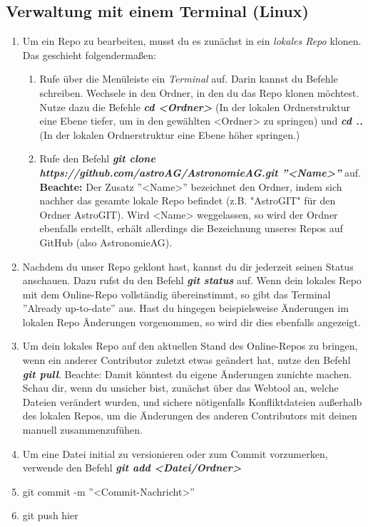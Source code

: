 \documentclass[12pt,a4paper,notitlepage,onecolumn,portrait,oneside, , , ]{scrartcl}
\begin{document}
\subsection{Verwaltung mit einem Terminal (Linux)}
\begin{enumerate}[label=\arabic*.]
\item Um ein Repo zu bearbeiten, musst du es zunächst in ein \textit{lokales Repo} klonen. Das geschieht folgendermaßen:
\begin{enumerate}[label=(\alph*)]
\item Rufe über die Menüleiste ein \textit{Terminal} auf. Darin kannst du Befehle schreiben. Wechsele in den Ordner, in den du das Repo klonen möchtest. Nutze dazu die Befehle \textbf{\textit{cd <Ordner>}} (In der lokalen Ordnerstruktur eine Ebene tiefer, um in den gewählten <Ordner> zu springen) und \textbf{\textit{cd ..}} (In der lokalen Ordnerstruktur eine Ebene höher springen.)
\item Rufe den Befehl \textbf{\textit{git clone https://github.com/astroAG/AstronomieAG.git ''<Name>''}} auf. \textbf{Beachte:} Der Zusatz ''<Name>'' bezeichnet den Ordner, indem sich nachher das gesamte lokale Repo befindet (z.B. "AstroGIT" für den Ordner AstroGIT). Wird <Name> weggelassen, so wird der Ordner ebenfalls erstellt, erhält allerdings die Bezeichnung unseres Repos auf GitHub (also AstronomieAG).
\end{enumerate}
\item Nachdem du unser Repo geklont hast, kannst du dir jederzeit seinen Status anschauen. Dazu rufst du den Befehl \textbf{\textit{git status}} auf. Wenn dein lokales Repo mit dem Online-Repo vollständig übereinstimmt, so  gibt das Terminal ''Already up-to-date'' aus. Hast du hingegen beispielsweise Änderungen im lokalen Repo Änderungen vorgenommen, so wird dir dies ebenfalls angezeigt.
\item Um dein lokales Repo auf den aktuellen Stand des Online-Repos zu bringen, wenn ein anderer Contributor zuletzt etwas geändert hat, nutze den Befehl \textbf{\textit{git pull}}. Beachte: Damit könntest du eigene Änderungen zunichte machen. Schau dir, wenn du unsicher bist, zunächst über das Webtool an, welche Dateien verändert wurden, und sichere nötigenfalls Konfliktdateien außerhalb des lokalen Repos, um die Änderungen des anderen Contributors mit deinen manuell zusammenzufühen.
\item Um eine Datei initial zu versionieren oder zum Commit vorzumerken, verwende den Befehl \textbf{\textit{git add <Datei/Ordner>}}
\item git commit -m ''<Commit-Nachricht>''
\item git push hier
\end{enumerate}
\end{document}
